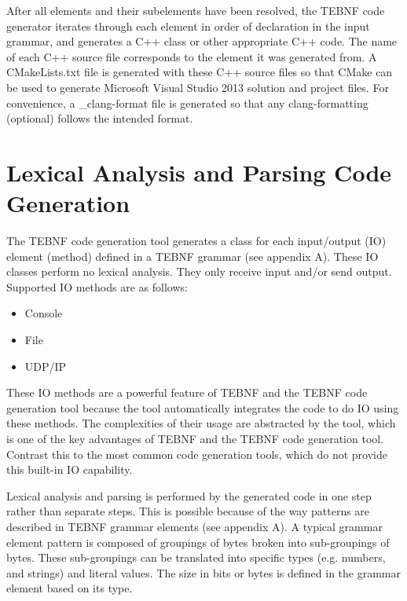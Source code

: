 \indent
After all elements and their subelements have been resolved, the TEBNF code generator iterates through each element in order of declaration in the input grammar, and generates a C++ class or other appropriate C++ code.  The name of each C++ source file corresponds to the element it was generated from.  A CMakeLists.txt file is generated with these C++ source files so that CMake can be used to generate Microsoft Visual Studio 2013 solution and project files.  For convenience, a \_clang-format file is generated so that any clang-formatting (optional) follows the intended format.

\section{Lexical Analysis and Parsing Code Generation}
The TEBNF code generation tool generates a class for each input/output (IO) element (method) defined in a TEBNF grammar (see appendix A).  These IO classes perform no lexical analysis.  They only receive input and/or send output.  Supported IO methods are as follows:
\begin{itemize}
  \item Console
  \item File
  \item UDP/IP
\end{itemize}

\indent
These IO methods are a powerful feature of TEBNF and the TEBNF code generation tool because the tool automatically integrates the code to do IO using these methods.  The complexities of their usage are abstracted by the tool, which is one of the key advantages of TEBNF and the TEBNF code generation tool.  Contrast this to the most common code generation tools, which do not provide this built-in IO capability.

\indent
Lexical analysis and parsing is performed by the generated code in one step rather than separate steps.  This is possible because of the way patterns are described in TEBNF grammar elements (see appendix A).  A typical grammar element pattern is composed of groupings of bytes broken into sub-groupings of bytes.  These sub-groupings can be translated into specific types (e.g. numbers, and strings) and literal values.  The size in bits or bytes is defined in the grammar element based on its type.

